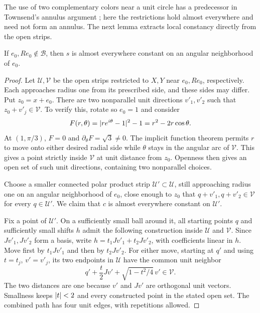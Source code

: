 The use of two complementary colors near a unit circle has a
predecessor in Townsend's annulus argument
\citep[Theorems~1 and~4]{Townsend2005}; here the restrictions hold
almost everywhere and need not form an annulus.  The next lemma
extracts local constancy directly from the open strips.

\begin{lemma}\label{lem:angular-binary-local}
If \(e_0,Re_0\notin\mathcal B\), then \(s\) is almost
everywhere constant on an angular neighborhood of \(e_0\).
\end{lemma}

\begin{proof}
Let \(\mathcal U,\mathcal V\) be the open strips restricted
to \(X,Y\) near \(e_0,Re_0\), respectively.  Each approaches
radius one from its prescribed side, and these sides may
differ.  Put \(z_0=x+e_0\).  There are two nonparallel unit
directions \(v'_1,v'_2\) such that
\(z_0+v'_j\in\mathcal V\).  To verify this, rotate so
\(e_0=1\) and consider
\[
 F(r,\theta)=\lvert r e^{i\theta}-1\rvert^2-1
            =r^2-2r\cos\theta.
\]
At \((1,\pi/3)\), \(F=0\) and
\(\partial_\theta F=\sqrt3\ne0\).  The implicit function
theorem permits \(r\) to move onto either desired radial
side while \(\theta\) stays in the angular arc of
\(\mathcal V\).  This gives a point strictly inside
\(\mathcal V\) at unit distance from \(z_0\).  Openness
then gives an open set of such unit directions, containing
two nonparallel choices.

Choose a smaller connected polar product strip
\(\mathcal U'\subset\mathcal U\), still approaching radius
one on an angular neighborhood of \(e_0\), close enough to
\(z_0\) that
\(q+v'_1,q+v'_2\in\mathcal V\) for every
\(q\in\mathcal U'\).  We claim that \(c\) is almost
everywhere constant on \(\mathcal U'\).

Fix a point of \(\mathcal U'\).  On a sufficiently small
ball around it, all starting points \(q\) and sufficiently
small shifts \(h\) admit the following construction inside
\(\mathcal U\) and \(\mathcal V\).  Since
\(Jv'_1,Jv'_2\) form a basis, write
\(h=t_1Jv'_1+t_2Jv'_2\), with coefficients linear in \(h\).
Move first by \(t_1Jv'_1\) and then by \(t_2Jv'_2\).
For either move, starting at \(q'\) and using \(t=t_j\),
\(v'=v'_j\), its two endpoints in \(\mathcal U\) have
the common unit neighbor
\begin{equation}\label{eq:angular-even-path}
 q'+\frac{t}{2}Jv'+\sqrt{1-t^2/4}\,v'\in\mathcal V.
\end{equation}
The two distances are one because \(v'\) and \(Jv'\) are
orthogonal unit vectors.  Smallness keeps \(\lvert t\rvert<2\)
and every constructed point in the stated open set.  The
combined path has four unit edges, with repetitions allowed.


\end{proof}
